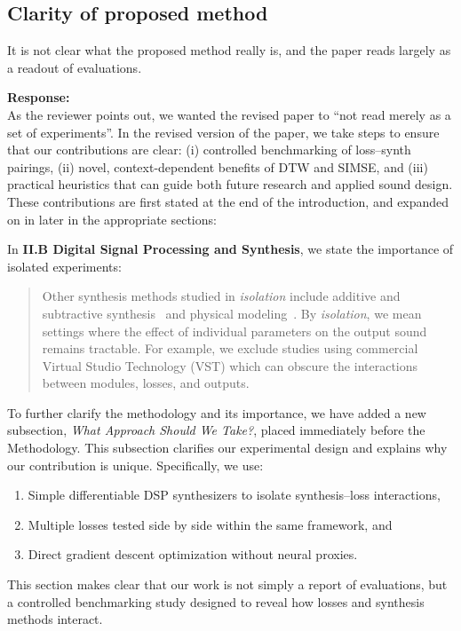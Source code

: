 \documentclass[11pt]{article}
\begin{document}
\subsection*{Clarity of proposed method}
\noindent It is not clear what the proposed method really is, and the paper reads largely as a readout of evaluations.  

\noindent\textbf{Response:} \\
As the reviewer points out, we wanted the revised paper to ``not read merely as a set of experiments''.  In the revised version of the paper, we take steps to ensure that our contributions are clear: (i) controlled benchmarking of loss--synth pairings, (ii) novel, context-dependent benefits of DTW and SIMSE, and (iii) practical heuristics that can guide both future research and applied sound design. These contributions are first stated at the end of the introduction, and expanded on in later in the appropriate sections:

\medskip
\noindent In \textbf{II.B Digital Signal Processing and Synthesis}, we state the importance of isolated experiments:
\begin{quote}\small\ttfamily
Other synthesis methods studied in \textit{isolation} include additive and subtractive synthesis~\cite{engel2020ddsp,masuda2023improving,salimi2020make} and physical modeling~\cite{riionheimo2003parameter,han2024learning}. By \textit{isolation}, we mean settings where the effect of individual parameters on the output sound remains tractable. For example, we exclude studies using commercial Virtual Studio Technology (VST) which can obscure the interactions between modules, losses, and outputs. 
\end{quote}

\noindent To further clarify the methodology and its importance, we have added a new subsection, \emph{What Approach Should We Take?}, placed immediately before the Methodology. This subsection clarifies our experimental design and explains why our contribution is unique. Specifically, we use:  
\begin{enumerate}
  \item Simple differentiable DSP synthesizers to isolate synthesis--loss interactions,  
  \item Multiple losses tested side by side within the same framework, and  
  \item Direct gradient descent optimization without neural proxies.  
\end{enumerate}
This section makes clear that our work is not simply a report of evaluations, but a controlled benchmarking study designed to reveal how losses and synthesis methods interact.  
\end{document}
